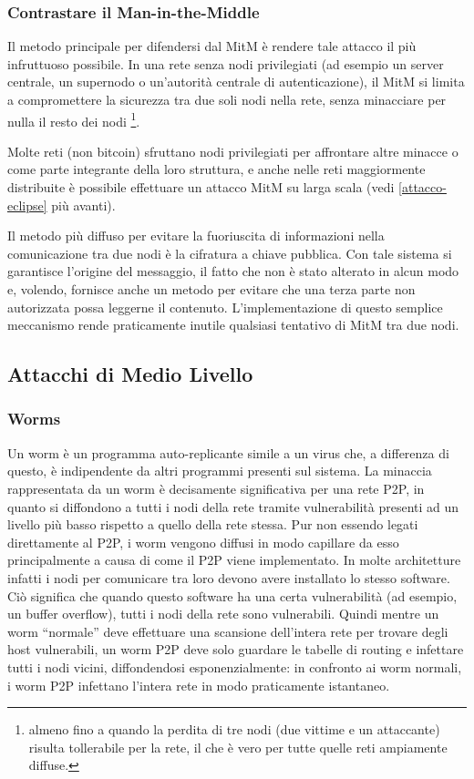 \subsubsection{Contrastare il Man-in-the-Middle}\label{contrastare-il-man-in-the-middle}

Il metodo principale per difendersi dal MitM è rendere tale attacco il più infruttuoso possibile. In una rete senza nodi privilegiati (ad esempio un server centrale, un supernodo o un'autorità centrale di autenticazione), il MitM si limita a compromettere la sicurezza tra due soli nodi nella rete, senza minacciare per nulla il resto dei nodi \footnote{almeno fino a quando la perdita di tre nodi (due vittime e un   attaccante) risulta tollerabile per la rete, il che è vero per tutte   quelle reti ampiamente diffuse.}.

Molte reti (non bitcoin) sfruttano nodi privilegiati per affrontare altre minacce o come parte integrante della loro struttura, e anche nelle reti maggiormente distribuite è possibile effettuare un attacco MitM su larga scala (vedi \ref{attacco-eclipse} più avanti).

Il metodo più diffuso per evitare la fuoriuscita di informazioni nella comunicazione tra due nodi è la cifratura a chiave pubblica. Con tale sistema si garantisce l'origine del messaggio, il fatto che non è stato alterato in alcun modo e, volendo, fornisce anche un metodo per evitare che una terza parte non autorizzata possa leggerne il contenuto. L'implementazione di questo semplice meccanismo rende praticamente inutile qualsiasi tentativo di MitM tra due nodi.

\subsection{Attacchi di Medio Livello}\label{attacchi-di-medio-livello}

\subsubsection{Worms}\label{worms}

Un worm è un programma auto-replicante simile a un virus che, a differenza di questo, è indipendente da altri programmi presenti sul sistema. La minaccia rappresentata da un worm è decisamente significativa per una rete P2P, in quanto si diffondono a tutti i nodi della rete tramite vulnerabilità presenti ad un livello più basso rispetto a quello della rete stessa. Pur non essendo legati direttamente al P2P, i worm vengono diffusi in modo capillare da esso principalmente a causa di come il P2P viene implementato. In molte architetture infatti i nodi per comunicare tra loro devono avere installato lo stesso software. Ciò significa che quando questo software ha una certa vulnerabilità (ad esempio, un buffer overflow), tutti i nodi della rete sono vulnerabili. Quindi mentre un worm ``normale'' deve effettuare una scansione dell'intera rete per trovare degli host vulnerabili, un worm P2P deve solo guardare le tabelle di routing e infettare tutti i nodi vicini, diffondendosi esponenzialmente: in confronto ai worm normali, i worm P2P infettano l'intera rete in modo praticamente istantaneo.

